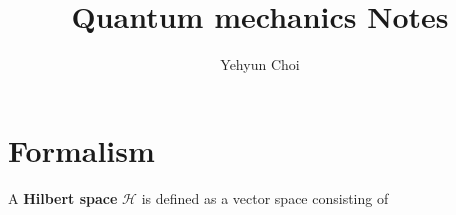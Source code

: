 \documentclass{article}
\title{Quantum mechanics Notes}
\author{Yehyun Choi}
\begin{document}
\maketitle
\pagebreak

\section{Formalism}

A \textbf{Hilbert space} $\mathcal H$ is defined as a vector space consisting of 
\end{document}
